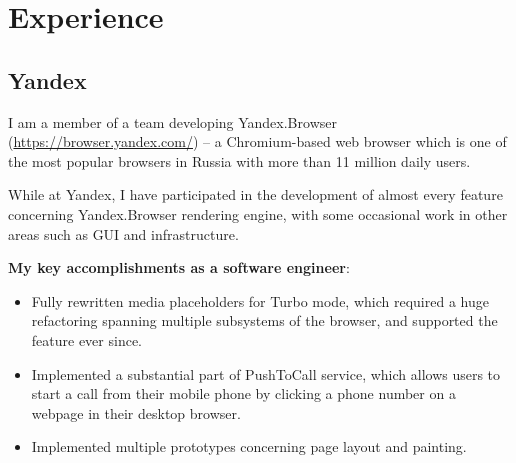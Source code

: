 \documentclass[11pt,a4paper]{moderncv}
\begin{document}
\makecvtitle

\section{Experience}
\subsection{Yandex}
  I am a member of a team developing Yandex.Browser (\url{https://browser.yandex.com/}) -- a Chromium-based web browser which is one of the most popular browsers in Russia with more than 11 million daily users.

  While at Yandex, I have participated in the development of almost every feature concerning Yandex.Browser rendering engine, with some occasional work in other areas such as GUI and infrastructure.

  \medskip
  \textbf{My key accomplishments as a software engineer}:
  \smallskip
  \begin{itemize}%
    \item Fully rewritten media placeholders for Turbo mode, which required a huge refactoring spanning multiple subsystems of the browser, and supported the feature ever since.
    \item Implemented a substantial part of PushToCall service, which allows users to start a call from their mobile phone by clicking a phone number on a webpage in their desktop browser.
    \item Implemented multiple prototypes concerning page layout and painting.
  \end{itemize}
\end{document}
